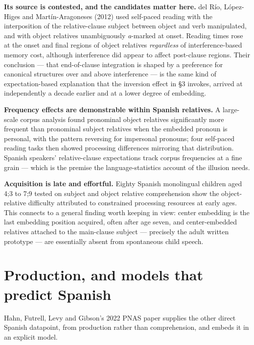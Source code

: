 \documentclass[11pt, a4paper]{article}
\begin{document}
\textbf{Its source is contested, and the candidates matter here.} del Río, López-Higes and Martín-Aragoneses (2012) used self-paced reading with the interposition of the relative-clause subject between object and verb manipulated, and with object relatives unambiguously \emph{a}-marked at onset. Reading times rose at the onset and final regions of object relatives \emph{regardless} of interference-based memory cost, although interference did appear to affect post-clause regions. Their conclusion --- that end-of-clause integration is shaped by a preference for canonical structures over and above interference --- is the same kind of expectation-based explanation that the inversion effect in \S3 invokes, arrived at independently a decade earlier and at a lower degree of embedding.

\textbf{Frequency effects are demonstrable within Spanish relatives.} A large-scale corpus analysis found pronominal object relatives significantly more frequent than pronominal subject relatives when the embedded pronoun is personal, with the pattern reversing for impersonal pronouns; four self-paced reading tasks then showed processing differences mirroring that distribution. Spanish speakers' relative-clause expectations track corpus frequencies at a fine grain --- which is the premise the language-statistics account of the illusion needs.

\textbf{Acquisition is late and effortful.} Eighty Spanish monolingual children aged 4;3 to 7;9 tested on subject and object relative comprehension show the object-relative difficulty attributed to constrained processing resources at early ages. This connects to a general finding worth keeping in view: center embedding is the last embedding position acquired, often after age seven, and center-embedded relatives attached to the main-clause subject --- precisely the adult written prototype --- are essentially absent from spontaneous child speech.

\section{Production, and models that predict Spanish}

Hahn, Futrell, Levy and Gibson's 2022 PNAS paper supplies the other direct Spanish datapoint, from production rather than comprehension, and embeds it in an explicit model.
\end{document}
